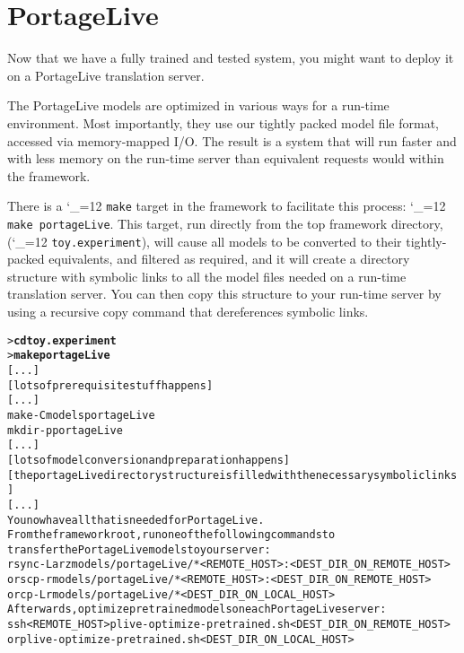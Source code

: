 \documentclass[11pt,letterpaper]{article}
\def\code{\begingroup\catcode`\_=12 \codex}
\newcommand{\codex}[1]{\texttt{#1}\endgroup}
\begin{document}
\section{PortageLive} \label{PLive}

Now that we have a fully trained and tested system, you might want to deploy it
on a PortageLive translation server.

The PortageLive models are optimized in various ways for a run-time
environment.  Most importantly, they use our tightly packed model file format,
accessed via memory-mapped I/O.
The result is a system that will run faster and with less memory on the
run-time server than equivalent requests would within the framework.

There is a \code{make} target in the framework to facilitate this process:
\code{make portageLive}.  This target, run directly from the top framework
directory, (\code{toy.experiment}), will cause all models to be converted to
their tightly-packed equivalents, and
filtered as required, and it will create a directory structure with symbolic
links to all the model files needed on a run-time translation server.  You can
then copy this structure to your run-time server by using a recursive copy
command that dereferences symbolic links.

\begin{small}
\begin{alltt}
   > \textbf{cd toy.experiment}
   > \textbf{make portageLive}
   [...]
   [lots of prerequisite stuff happens]
   [...]
   make -C models portageLive
   mkdir -p portageLive
   [...]
   [lots of model conversion and preparation happens]
   [the portageLive directory structure is filled with the necessary symbolic links]
   [...]
   You now have all that is needed for PortageLive.
   From the framework root, run one of the following commands to
   transfer the PortageLive models to your server:
        rsync -Larz models/portageLive/* <REMOTE_HOST>:<DEST_DIR_ON_REMOTE_HOST>
   or   scp -r models/portageLive/* <REMOTE_HOST>:<DEST_DIR_ON_REMOTE_HOST>
   or   cp -Lr models/portageLive/* <DEST_DIR_ON_LOCAL_HOST>
   Afterwards, optimize pretrained models on each PortageLive server:
        ssh <REMOTE_HOST> plive-optimize-pretrained.sh <DEST_DIR_ON_REMOTE_HOST>
   or   plive-optimize-pretrained.sh <DEST_DIR_ON_LOCAL_HOST>
\end{alltt}
\end{small}
\end{document}
